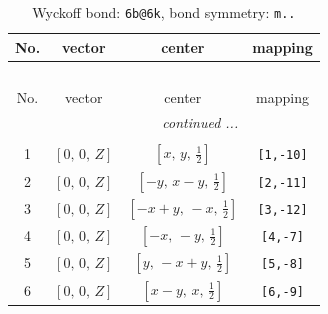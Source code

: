 \documentclass[fleqn,8pt]{jsarticle}
\begin{document}
\begin{longtable}{cccc}
\caption{Wyckoff bond: {\tt 6b@6k}, bond symmetry: {\tt m..}}
 \\
 \hline \hline
No. & vector & center & mapping \\ \hline \endfirsthead

\multicolumn{3}{l}{\tablename\ \thetable{}} \\
 \hline \hline
No. & vector & center & mapping \\ \hline \endhead

 \hline \hline
\multicolumn{3}{r}{\footnotesize\it continued ...} \\ \endfoot

 \hline \hline
\multicolumn{3}{r}{} \\ \endlastfoot

1 & $\left[ 0,\, 0,\, Z \right]$ & $\left[ x,\, y,\, \frac{1}{2} \right]$ & {\tt [1,-10]} \\ \hline
2 & $\left[ 0,\, 0,\, Z \right]$ & $\left[ - y,\, x - y,\, \frac{1}{2} \right]$ & {\tt [2,-11]} \\ \hline
3 & $\left[ 0,\, 0,\, Z \right]$ & $\left[ - x + y,\, - x,\, \frac{1}{2} \right]$ & {\tt [3,-12]} \\ \hline
4 & $\left[ 0,\, 0,\, Z \right]$ & $\left[ - x,\, - y,\, \frac{1}{2} \right]$ & {\tt [4,-7]} \\ \hline
5 & $\left[ 0,\, 0,\, Z \right]$ & $\left[ y,\, - x + y,\, \frac{1}{2} \right]$ & {\tt [5,-8]} \\ \hline
6 & $\left[ 0,\, 0,\, Z \right]$ & $\left[ x - y,\, x,\, \frac{1}{2} \right]$ & {\tt [6,-9]} \\
\end{longtable}
\renewcommand{\arraystretch}{1.2}
\end{document}
